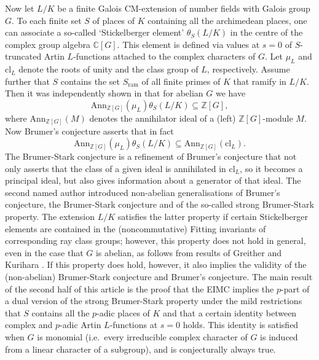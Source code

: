 \documentclass[12pt]{amsart}
\theoremstyle{plain}
\theoremstyle{remark}
\theoremstyle{definition}
\numberwithin{equation}{section}
\begin{document}
Now let $L/K$ be a finite Galois CM-extension of number fields with Galois group $G$. 
To each finite set $S$ of places of $K$ containing all the archimedean places, one can associate a so-called `Stickelberger element'
$\theta_{S}(L/K)$ in the centre of the complex group algebra ${\mathbb{C}}[G]$. 
This element is defined via values at $s=0$ of $S$-truncated Artin $L$-functions attached to the complex characters of $G$.
Let $\mu_{L}$ and ${\mathrm{cl}}_{L}$ denote the roots of unity and the class group of $L$, respectively.
Assume further that $S$ contains the set $S_{\mathrm{ram}}$ of all finite primes of $K$ that ramify in $L/K$. 
Then it was independently shown in \cite{MR524276, MR579702, MR525346} that for abelian $G$ we have
\[
    {\mathrm{Ann}}_{{\mathbb{Z}}[G]} (\mu_{L}) \theta_{S}(L/K) \subseteq {\mathbb{Z}}[G],
\]
where ${\mathrm{Ann}}_{{\mathbb{Z}}[G]}(M)$ denotes the annihilator ideal of a (left) ${\mathbb{Z}}[G]$-module $M$.
Now Brumer's conjecture asserts that in fact
\[
{\mathrm{Ann}}_{{\mathbb{Z}}[G]} (\mu_{L}) \theta_{S}(L/K) \subseteq {\mathrm{Ann}}_{{\mathbb{Z}}[G]}({\mathrm{cl}}_{L}).
\]
The Brumer-Stark conjecture is a refinement of Brumer's conjecture that not only asserts that the class of a given ideal 
is annihilated in ${\mathrm{cl}}_{L}$, so it becomes a principal ideal, but also gives information about a generator of that ideal. 
The second named author \cite{MR2976321} introduced non-abelian generalisations of Brumer's conjecture, 
the Brumer-Stark conjecture and of the so-called strong Brumer-Stark property.
The extension $L/K$ satisfies the latter property if certain Stickelberger elements are contained in
the (noncommutative) Fitting invariants of corresponding ray class groups; however, this property
does not hold in general, even in the case that $G$ is abelian,
as follows from results of Greither and Kurihara \cite{MR2443336}. 
If this property does hold, however, it also implies the validity of the (non-abelian) Brumer-Stark conjecture and Brumer's conjecture. 
The main result of the second half of this article is the proof that the EIMC implies 
the $p$-part of a dual version of the strong Brumer-Stark property under the mild restrictions
that $S$ contains all the $p$-adic places of $K$ and that a certain identity between complex and $p$-adic Artin $L$-functions at $s=0$ holds. 
This identity is satisfied when $G$ is monomial (i.e.\ every irreducible complex character of $G$ is induced from a linear character of a subgroup), 
and is conjecturally always true.
\end{document}
